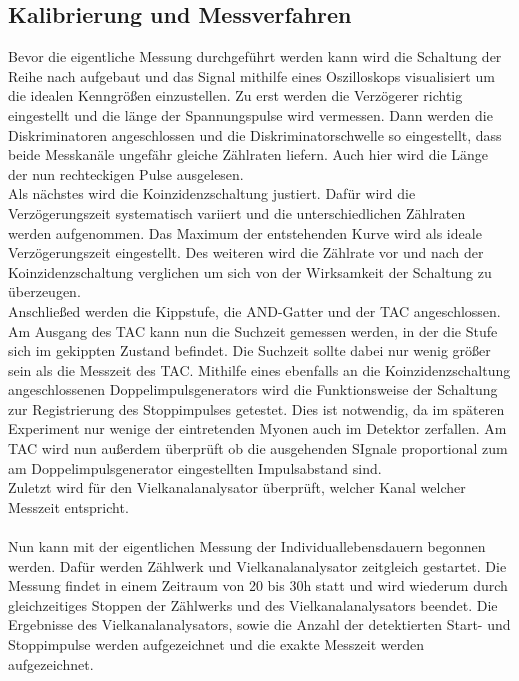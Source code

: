 \subsection{Kalibrierung und Messverfahren}
\label{sub:kalimes}
Bevor die eigentliche Messung durchgeführt werden kann wird die Schaltung der Reihe nach aufgebaut und das Signal mithilfe eines Oszilloskops visualisiert um die idealen Kenngrößen einzustellen.
Zu erst werden die Verzögerer richtig eingestellt und die länge der Spannungspulse wird vermessen.
Dann werden die Diskriminatoren angeschlossen und die Diskriminatorschwelle so eingestellt, dass beide Messkanäle ungefähr gleiche Zählraten liefern.
Auch hier wird die Länge der nun rechteckigen Pulse ausgelesen.\\
Als nächstes wird die Koinzidenzschaltung justiert. Dafür wird die Verzögerungszeit systematisch variiert und die unterschiedlichen Zählraten werden aufgenommen.
Das Maximum der entstehenden Kurve wird als ideale Verzögerungszeit eingestellt. Des weiteren wird die Zählrate vor und nach der Koinzidenzschaltung verglichen um sich von der Wirksamkeit der Schaltung
zu überzeugen.\\
Anschließed werden die Kippstufe, die AND-Gatter und der TAC angeschlossen. Am Ausgang des TAC kann nun die Suchzeit gemessen werden, in der die Stufe sich im gekippten Zustand befindet.
Die Suchzeit sollte dabei nur wenig größer sein als die Messzeit des TAC.
Mithilfe eines ebenfalls an die Koinzidenzschaltung angeschlossenen Doppelimpulsgenerators wird die Funktionsweise der Schaltung zur Registrierung des Stoppimpulses getestet.
Dies ist notwendig, da im späteren Experiment nur wenige der eintretenden Myonen auch im Detektor zerfallen. Am TAC wird nun außerdem überprüft ob die ausgehenden SIgnale proportional zum am Doppelimpulsgenerator
eingestellten Impulsabstand sind.\\
Zuletzt wird für den Vielkanalanalysator überprüft, welcher Kanal welcher Messzeit entspricht.\\
\\
Nun kann mit der eigentlichen Messung der Individuallebensdauern begonnen werden. Dafür werden Zählwerk und Vielkanalanalysator zeitgleich gestartet. Die Messung findet in einem Zeitraum von 20 bis 30h statt und
wird wiederum durch gleichzeitiges Stoppen der Zählwerks und des Vielkanalanalysators beendet. Die Ergebnisse des Vielkanalanalysators, sowie die Anzahl der detektierten Start- und Stoppimpulse werden aufgezeichnet
und die exakte Messzeit werden aufgezeichnet.\\

